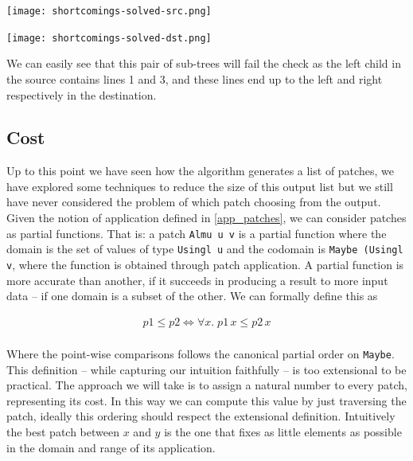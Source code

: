 \documentclass[11pt, titlepage]{article}
\newcommand{\toHaskell}[1]{\texttt{#1}\xspace}
\begin{document}
\vspace{.6em}
\begin{minipage}{0.4\linewidth}
\centering
\texttt{[image: shortcomings-solved-src.png]}
\end{minipage}
\begin{minipage}{0.4\linewidth}
\centering
\texttt{[image: shortcomings-solved-dst.png]}
\end{minipage}
\vspace{.6em}

We can easily see that this pair of sub-trees will fail the check as the left child in the source contains lines 1 and 3, and these lines end up to the left and right respectively in the destination.
 
\subsection{Cost}\label{cost}
Up to this point we have seen how the algorithm generates a list of patches, we have explored some techniques to reduce the size of this output list but we still have never considered the problem of which patch choosing from the output.
Given the notion of application defined in \ref{app_patches}, we can consider patches as partial functions. That is: a patch \toHaskell{Almu u v} is a partial function where the domain is the set of values of type \toHaskell{Usingl u} and the codomain is \toHaskell{Maybe (Usingl v}, where the function is obtained through patch application.
A partial function is more accurate than another, if it succeeds in producing a result to more input data -- if one domain is a subset of the other.
We can formally define this as

\begin{center}
\begin{align*}
p1 \leq  p2 \iff  \forall x . \; p1 \, x \leq p2 \, x \\
\end{align*}
\end{center}
Where the point-wise comparisons follows the canonical partial order on \toHaskell{Maybe}.
This definition -- while capturing our intuition faithfully -- is too extensional to be practical. The approach we will take is to assign a natural number to every patch, representing its cost. In this way we can compute this value by just traversing the patch, ideally this ordering should respect the extensional definition. Intuitively the best patch between $x$ and $y$ is the one that fixes as little elements as possible in the domain and range of its application.
\end{document}

